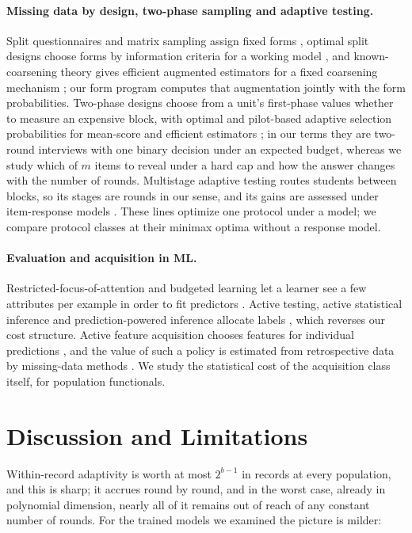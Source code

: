 \documentclass{article}
\begin{document}
\paragraph{Missing data by design, two-phase sampling and adaptive testing.} Split questionnaires and matrix sampling assign fixed forms \citep{raghunathan1995,graham2006,thomas2006,chipperfield2009,rhemtulla2012}, optimal split designs choose forms by information criteria for a working model \citep{adiguzel2008}, and known-coarsening theory gives efficient augmented estimators for a fixed coarsening mechanism \citep{robins1994,tsiatis2006}; our form program computes that augmentation jointly with the form probabilities. Two-phase designs choose from a unit's first-phase values whether to measure an expensive block, with optimal and pilot-based adaptive selection probabilities for mean-score and efficient estimators \citep{reilly1995,gilbert2014,mcisaac2015,tao2020,chen2020,chen2022}; in our terms they are two-round interviews with one binary decision under an expected budget, whereas we study which of $m$ items to reveal under a hard cap and how the answer changes with the number of rounds. Multistage adaptive testing routes students between blocks, so its stages are rounds in our sense, and its gains are assessed under item-response models \citep{yamamoto2018,fink2024,konig2026}. These lines optimize one protocol under a model; we compare protocol classes at their minimax optima without a response model.

\paragraph{Evaluation and acquisition in ML.} Restricted-focus-of-attention and budgeted learning let a learner see a few attributes per example in order to fit predictors \citep{bendavid1998,cesa2011,hazan2012,lizotte2003,kapoor2005}. Active testing, active statistical inference and prediction-powered inference allocate labels \citep{kossen2021,zrnic2024,angelopoulos2023}, which reverses our cost structure. Active feature acquisition chooses features for individual predictions \citep{turney1995,trapeznikov2013,nan2017,ma2019,covert2023}, and the value of such a policy is estimated from retrospective data by missing-data methods \citep{vonkleist2025}. We study the statistical cost of the acquisition class itself, for population functionals.

\section{Discussion and Limitations}\label{sec:discussion}
Within-record adaptivity is worth at most $2^{b-1}$ in records at every population, and this is sharp; it accrues round by round, and in the worst case, already in polynomial dimension, nearly all of it remains out of reach of any constant number of rounds. For the trained models we examined the picture is milder: \nDiscussionSentence
\end{document}
